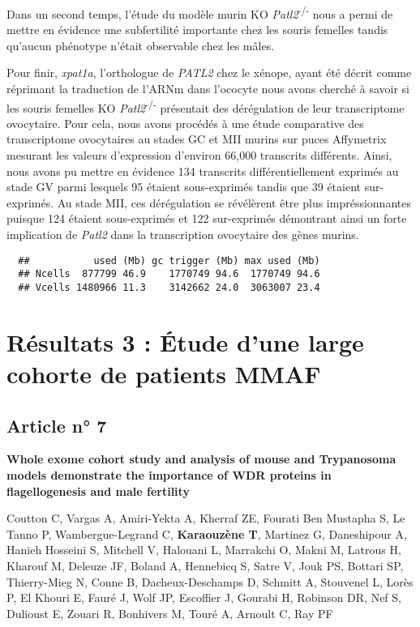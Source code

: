 \documentclass[12pt,twoside]{reedthesis}
\theoremstyle{definition}
\theoremstyle{definition}
\theoremstyle{remark}
\begin{document}
  Dans un second temps, l'étude du modèle murin KO
  \emph{Patl2}\textsuperscript{-/-} nous a permi de mettre en évidence une
  subfertilité importante chez les souris femelles tandis qu'aucun
  phénotype n'était observable chez les mâles.
  
  Pour finir, \emph{xpat1a}, l'orthologue de \emph{PATL2} chez le xénope,
  ayant été décrit comme réprimant la traduction de l'ARNm dans l'ococyte
  nous avons cherché à savoir si les souris femelles KO
  \emph{Patl2}\textsuperscript{-/-} présentait des dérégulation de leur
  transcriptome ovocytaire. Pour cela, nous avons procédés à une étude
  comparative des transcriptome ovocytaires au stades GC et MII murins sur
  puces Affymetrix mesurant les valeurs d'expression d'environ 66,000
  transcrits différents. Ainsi, nous avons pu mettre en évidence 134
  transcrits différentiellement exprimés au stade GV parmi lesquels 95
  étaient sous-exprimés tandis que 39 étaient sur-exprimés. Au stade MII,
  ces dérégulation se révélèrent être plus impréssionnantes puisque 124
  étaient sous-exprimés et 122 sur-exprimés démontrant ainsi un forte
  implication de \emph{Patl2} dans la transcription ovocytaire des gènes
  murins.
  
  \begin{verbatim}
  ##           used (Mb) gc trigger (Mb) max used (Mb)
  ## Ncells  877799 46.9    1770749 94.6  1770749 94.6
  ## Vcells 1480966 11.3    3142662 24.0  3063007 23.4
  \end{verbatim}
  
  \newpage  
  
  \section{Résultats 3 : Étude d'une large cohorte de patients
  MMAF}\label{resultats-3-etude-dune-large-cohorte-de-patients-mmaf}
  
  \subsection{Article n° 7}\label{article-n-7}
  
  \textbf{Whole exome cohort study and analysis of mouse and Trypanosoma
  models demonstrate the importance of WDR proteins in flagellogenesis and
  male fertility}
  
  Coutton C, Vargas A, Amiri-Yekta A, Kherraf ZE, Fourati Ben Mustapha S,
  Le Tanno P, Wambergue-Legrand C, \textbf{Karaouzène T}, Martinez G,
  Daneshipour A, Hanieh Hosseini S, Mitchell V, Halouani L, Marrakchi O,
  Makni M, Latrous H, Kharouf M, Deleuze JF, Boland A, Hennebicq S, Satre
  V, Jouk PS, Bottari SP, Thierry-Mieg N, Conne B, Dacheux-Deschamps D,
  Schmitt A, Stouvenel L, Lorès P, El Khouri E, Fauré J, Wolf JP,
  Escoffier J, Gourabi H, Robinson DR, Nef S, Dulioust E, Zouari R,
  Bonhivers M, Touré A, Arnoult C, Ray PF
  
\end{document}

